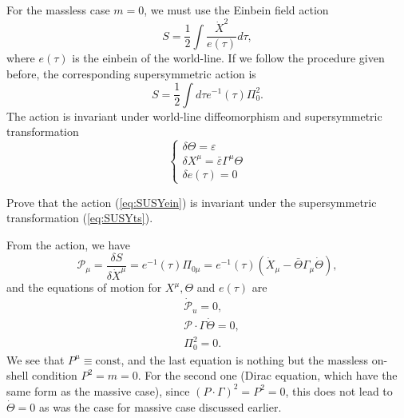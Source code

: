 \documentclass[graybox,envcountchap,sectrefs]{svmono}
\begin{document}
For the massless case $m=0$, we must use the Einbein field action
\begin{equation}
	S=\frac{1}{2}\int \frac{\dot{X}^2}{e(\tau)}d\tau,
\end{equation}
where $e(\tau)$ is the einbein of the world-line. If we follow the procedure given before, the corresponding supersymmetric action is
\begin{equation}\label{eq:SUSYein}
S=\frac{1}{2} \int d \tau e^{-1}(\tau) \Pi_{0}^{2}.	
\end{equation}
The action is invariant under world-line diffeomorphism and supersymmetric transformation
\begin{equation}\label{eq:SUSYts}
\begin{cases}
\delta\Theta=\varepsilon	\\
\delta X^{\mu}=\bar{\varepsilon}\Gamma^{\mu}\Theta\\
\delta e(\tau)=0
\end{cases}	
\end{equation}
\begin{exercise}
Prove that the action (\ref{eq:SUSYein})	 is invariant under the supersymmetric transformation (\ref{eq:SUSYts}).
\end{exercise}

From the action, we have
\begin{equation}
	\mathcal{P}_{\mu}=\frac{\delta S}{\delta \dot{X}^{\mu}}=e^{-1}(\tau) \Pi_{0 \mu}=e^{-1}(\tau)\left(\dot{X}_{\mu}-\bar{\Theta} \Gamma_{\mu} \dot{\Theta}\right),
\end{equation}
and the equations of motion for $X^{\mu}, \Theta$ and $e(\tau)$ are
\begin{align}
&\dot{\mathcal{P}}_{u}= 0, \\
&\mathcal{P}\cdot\Gamma \dot{\Theta} =0, \\
&\Pi_{0}^{2} =0.
\end{align}
We see that $P^{\mu}\equiv\mathrm{const}$, and the last equation is nothing but the massless on-shell condition $P^{2}=m=0$. For the second one (Dirac equation, which have the same form as the massive case), since $(P \cdot \Gamma)^{2}=P^{2}=0$, this does not lead to $\dot{\Theta}=0$ as was the case for massive case discussed earlier.
\end{document}
